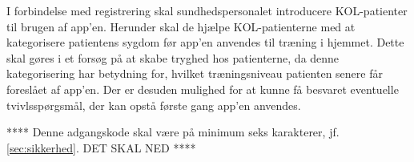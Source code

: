 I forbindelse med registrering skal sundhedspersonalet introducere KOL-patienter til brugen af app'en. Herunder skal de hjælpe KOL-patienterne med at kategorisere patientens sygdom før app'en anvendes til træning i hjemmet. Dette skal gøres i et forsøg på at skabe tryghed hos patienterne, da denne kategorisering har betydning for, hvilket træningsniveau patienten senere får foreslået af app'en. Der er desuden mulighed for at kunne få besvaret eventuelle tvivlsspørgsmål, der kan opstå første gang app'en anvendes. 



**** Denne adgangskode skal være på minimum seks karakterer, jf. \autoref{sec:sikkerhed}. DET SKAL NED ****


